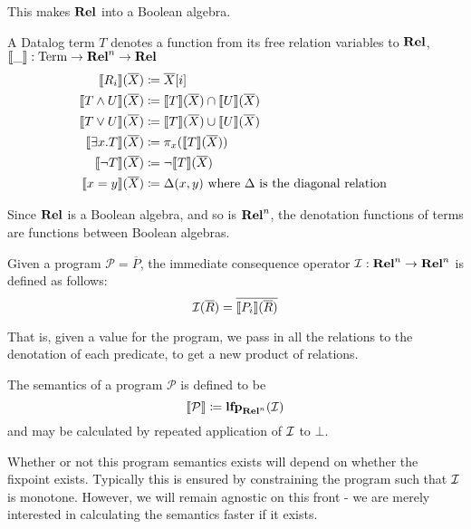 This makes $\mathbf{Rel}$ into a Boolean algebra.

\begin{defn}
  A Datalog term $T$ denotes a function from its free relation variables to
  $\mathbf{Rel}$, $\llbracket \_ \rrbracket : \mathrm{Term} \rightarrow \mathbf{Rel}^n \rightarrow \mathbf{Rel}$
  \begin{align*}
    \llbracket R_i \rrbracket(\overline{X}) &\coloneqq \overline{X}[i] \\
    \llbracket T \wedge U \rrbracket(\overline{X}) &\coloneqq \llbracket T \rrbracket(\overline{X}) \cap  \llbracket U \rrbracket(\overline{X})\\
    \llbracket T \vee U \rrbracket(\overline{X}) &\coloneqq \llbracket T \rrbracket(\overline{X}) \cup  \llbracket U \rrbracket(\overline{X})\\
    \llbracket \exists x. T \rrbracket(\overline{X}) &\coloneqq \pi_x(\llbracket T \rrbracket(\overline{X}))\\
    \llbracket \neg T \rrbracket(\overline{X}) &\coloneqq \neg \llbracket T \rrbracket(\overline{X})\\
    \llbracket x=y \rrbracket(\overline{X}) &\coloneqq \Delta(x, y) \text{ where } \Delta \text{ is the diagonal relation }
  \end{align*}
\end{defn}

Since $\mathbf{Rel}$ is a Boolean algebra, and so is $\mathbf{Rel}^n$, the denotation
functions of terms are functions between Boolean algebras.

\begin{defn}
  Given a program $\mathcal{P} = \overline{P}$, the immediate consequence operator $\mathcal{I}: \mathbf{Rel}^n \rightarrow \mathbf{Rel}^n$ is defined as follows:
  $$\mathcal{I}(\overline{R}) = \overline{\llbracket P_i \rrbracket(\overline{R})}$$
\end{defn}

That is, given a value for the program, we pass in all the relations
to the denotation of each predicate, to get a new product of relations.

\begin{defn}
  The semantics of a program $\mathcal{P}$ is defined to be
  $$\llbracket \mathcal{P} \rrbracket \coloneqq \textbf{lfp}_{\mathbf{Rel}^n}(\mathcal{I})$$
  and may be calculated by repeated application of $\mathcal{I}$ to $\bot$.
\end{defn}

Whether or not this program semantics exists will depend on whether the fixpoint
exists. Typically this is ensured by constraining the program such that $\mathcal{I}$
is monotone. However, we will remain agnostic on this front - we are merely
interested in calculating the semantics faster if it exists.

